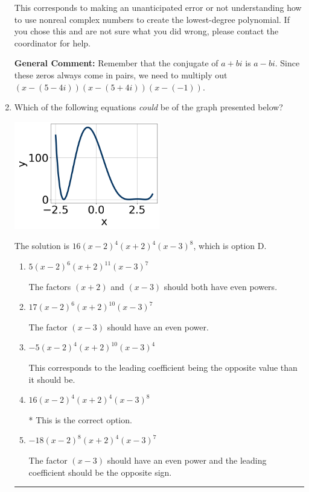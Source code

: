 \documentclass{extbook}[14pt]
\newcommand{\litem}[1]{\item #1

\rule{\textwidth}{0.4pt}}
\begin{document}
\begin{enumerate}
{\begin{enumerate}[label=\Alph*.]
This corresponds to making an unanticipated error or not understanding how to use nonreal complex numbers to create the lowest-degree polynomial. If you chose this and are not sure what you did wrong, please contact the coordinator for help.
\end{enumerate}

\textbf{General Comment:} Remember that the conjugate of $a+bi$ is $a-bi$. Since these zeros always come in pairs, we need to multiply out $(x-(5 - 4 i))(x-(5 + 4 i))(x-(-1))$.
}
\litem{
Which of the following equations \textit{could} be of the graph presented below?

\begin{center}
    \includegraphics[width=0.5\textwidth]{../Figures/polyGraphToFunctionA.png}
\end{center}


The solution is \( 16(x - 2)^{4} (x + 2)^{4} (x - 3)^{8} \), which is option D.\begin{enumerate}[label=\Alph*.]
\item \( 5(x - 2)^{6} (x + 2)^{11} (x - 3)^{7} \)

The factors $(x + 2)$ and $(x - 3)$ should both have even powers.
\item \( 17(x - 2)^{6} (x + 2)^{10} (x - 3)^{7} \)

The factor $(x - 3)$ should have an even power.
\item \( -5(x - 2)^{4} (x + 2)^{10} (x - 3)^{4} \)

This corresponds to the leading coefficient being the opposite value than it should be.
\item \( 16(x - 2)^{4} (x + 2)^{4} (x - 3)^{8} \)

* This is the correct option.
\item \( -18(x - 2)^{8} (x + 2)^{4} (x - 3)^{7} \)

The factor $(x - 3)$ should have an even power and the leading coefficient should be the opposite sign.
\end{enumerate}

}
\end{enumerate}
\end{document}

